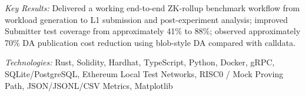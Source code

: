 \noindent
\textit{Key Results:} Delivered a working end-to-end ZK-rollup benchmark workflow from workload generation to L1 submission and post-experiment analysis; improved Submitter test coverage from approximately 41\% to 88\%; observed approximately 70\% DA publication cost reduction using blob-style DA compared with calldata.

\noindent
\textit{Technologies:} Rust, Solidity, Hardhat, TypeScript, Python, Docker, gRPC, SQLite/PostgreSQL, Ethereum Local Test Networks, RISC0 / Mock Proving Path, JSON/JSONL/CSV Metrics, Matplotlib